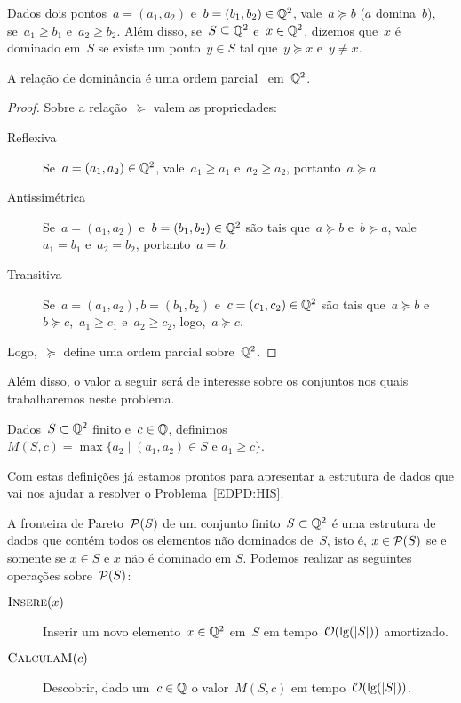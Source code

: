 \begin{defi}
Dados dois pontos~$a = (a_1,a_2)$ e~$b = (b_1,b_2) \in \mathbb{Q}^2$, vale~$a \succeq b$ ($a$ domina~$b$), se~$a_1 \geq b_1$ e~$a_2 \geq b_2$. Além disso, se~$S \subseteq \mathbb{Q}^2$ e~$x \in \mathbb{Q}^2$, dizemos que~$x$ é dominado em~$S$ se existe um ponto~$y \in S$ tal que~$y \succeq x$ e~$y \neq x$.
\end{defi}

\begin{prop}
A relação de dominância é uma ordem parcial~\cite[Apêndice B]{CLRS} em~$\mathbb{Q}^2$.
\end{prop}

\begin{proof}
Sobre a relação~$\succeq$ valem as propriedades:
\begin{description}
\item[Reflexiva] Se~$a = (a_1,a_2) \in \mathbb{Q}^2$, vale~$a_1 \geq a_1$ e~$a_2 \geq a_2$, portanto~$a \succeq a$.
\item[Antissimétrica] Se~$a = (a_1,a_2)$ e~$b = (b_1,b_2) \in \mathbb{Q}^2$ são tais que~$a \succeq b$ e~$b \succeq a$, vale~$a_1 = b_1$ e~$a_2 = b_2$, portanto~$a = b$.
\item[Transitiva] Se~$a = (a_1,a_2), b = (b_1,b_2)$ e~$c = (c_1,c_2) \in \mathbb{Q}^2$ são tais que~$a \succeq b$ e~$b \succeq c$,~$a_1 \geq c_1$ e~$a_2 \geq c_2$, logo,~$a \succeq c$.
\end{description}
Logo,~$\succeq$ define uma ordem parcial sobre~$\mathbb{Q}^2$.
\end{proof}

Além disso, o valor a seguir será de interesse sobre os conjuntos nos quais trabalharemos neste problema.
\begin{defi}
Dados~$S \subset \mathbb{Q}^2$ finito e~$c \in \mathbb{Q}$, definimos~${M(S,c) = \max\{a_2 \mid (a_1,a_2) \in S \text{ e } a_1 \geq c\}}$.
\end{defi}

Com estas definições já estamos prontos para apresentar a estrutura de dados que vai nos ajudar a resolver o Problema~\ref{EDPD:HIS}.
\begin{defi} \label{EDPD:Pareto}
A fronteira de Pareto~$\mathcal{P}(S)$ de um conjunto finito~$S \subset \mathbb{Q}^2$ é uma estrutura de dados que contém todos os elementos não dominados de~$S$, isto é, $x \in \mathcal{P}(S)$ se e somente se $x \in S$ e $x$ não é dominado em $S$. Podemos realizar as seguintes operações sobre~$\mathcal{P}(S)$:

\begin{description}
\item[$\textsc{Insere}(x)$] Inserir um novo elemento~$x \in \mathbb{Q}^2$ em~$S$ em tempo~$\mathcal{O}(\lg(|S|))$ amortizado.
\item[$\textsc{CalculaM}(c)$] Descobrir, dado um~$c \in \mathbb{Q}$ o valor~$M(S,c)$ em tempo~$\mathcal{O}(\lg(|S|))$.
\end{description}
\end{defi}

